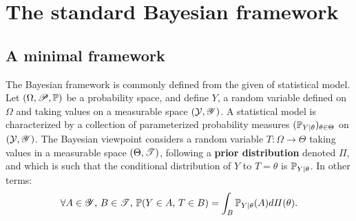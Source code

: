 




\section{The standard Bayesian framework}\label{sec:intro-ref:classical-framework}

\subsection{A minimal framework}\label{sec:intro-ref:minimalclassicframework}

The Bayesian framework is commonly defined from the given of statistical model.
Let $(\Omega,\mathscr{P},\mathbb{P})$ be a probability space, and define $Y$, a random variable defined on $\Omega$ and taking values on a measurable space $(\mathcal{Y},\mathscr{Y})$.
A statistical model is characterized by a collection of parameterized probability measures $(\mathbb{P}_{Y|\theta})_{\theta\in\Theta}$ on $(\mathcal{Y},\mathscr{Y})$.
The Bayesian viewpoint considers a random variable $T:\Omega\to\Theta$ taking values in a measurable space $(\Theta,\mathscr{T})$, following a \textbf{prior distribution} denoted $\varPi$, and which is such that the conditional distribution of $Y$ to $T=\theta$ is $\mathbb{P}_{Y|\theta}$. In other terms:
    \begin{equation}
        \forall A\in\mathscr{Y},\,B\in\mathscr{T},\, \mathbb{P}(Y\in A,\, T\in B) = \int_B \mathbb{P}_{Y|\theta}(A) d\varPi(\theta).
    \end{equation}

